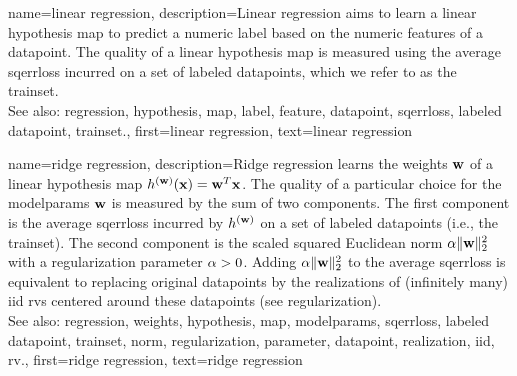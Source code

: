 {name={linear regression}, 
	description={Linear 
		\gls{regression} aims to learn a linear \gls{hypothesis} \gls{map} to predict a numeric \gls{label} based 
		on the numeric \glspl{feature} of a \gls{datapoint}. The quality of a linear \gls{hypothesis} \gls{map} is 
		measured using the average \gls{sqerrloss} incurred on a set of \glspl{labeled datapoint}, 
		which we refer to as the \gls{trainset}.
				\\
		See also: \gls{regression}, \gls{hypothesis}, \gls{map}, \gls{label}, \gls{feature}, \gls{datapoint},  \gls{sqerrloss}, \gls{labeled datapoint}, \gls{trainset}.},
	first={linear regression},
	text={linear regression}
}
        
{name={ridge regression}, 
	description={Ridge 
		\gls{regression} learns the \gls{weights} ${\bf w}$ of a linear \gls{hypothesis} \gls{map} $h^{({\bf w})}({\bf x})= {\bf w}^{T} {\bf x}$. 
		The quality of a particular choice for the \gls{modelparams} ${\bf w}$ is measured by the sum 
		of two components. The first component is the average \gls{sqerrloss} incurred by $h^{({\bf w})}$ on a set of 
		\glspl{labeled datapoint} (i.e., the \gls{trainset}). The second component is the scaled squared 
		Euclidean \gls{norm} $\alpha \| {\bf w} \|^{2}_{2}$ with a \gls{regularization} \gls{parameter} 
		$\alpha > 0$. Adding $\alpha \| {\bf w} \|^{2}_{2}$ to 
	    	the average \gls{sqerrloss} is equivalent to replacing original \glspl{datapoint} by the \glspl{realization} 
	    	of (infinitely many) \gls{iid} \glspl{rv} centered around these \glspl{datapoint} (see \gls{regularization}).
	    		\\
		See also: \gls{regression}, \gls{weights}, \gls{hypothesis}, \gls{map}, \gls{modelparams}, \gls{sqerrloss}, \gls{labeled datapoint}, \gls{trainset}, \gls{norm}, \gls{regularization}, \gls{parameter}, \gls{datapoint}, \gls{realization}, \gls{iid}, \gls{rv}.},
	first={ridge regression},
	text={ridge regression}
}


